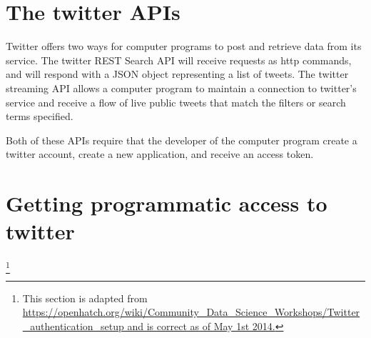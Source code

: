 \documentclass{article}\usepackage[]{graphicx}\usepackage[]{color}
\begin{document}
\section*{The twitter APIs}
Twitter offers two ways for computer programs to post and retrieve data from its service. The twitter REST Search API will receive requests as http commands, and will respond with a JSON object representing a list of tweets. The twitter streaming API allows a computer program to maintain a connection to twitter's service and receive a flow of live public tweets that match the filters or search terms specified.

Both of these APIs require that the developer of the computer program create a twitter account, create a new application, and receive an access token.

\section*{Getting programmatic access to twitter}\footnote{This section is adapted from \url{https://openhatch.org/wiki/Community_Data_Science_Workshops/Twitter_authentication_setup and is correct as of May 1st 2014.}}
\end{document}
